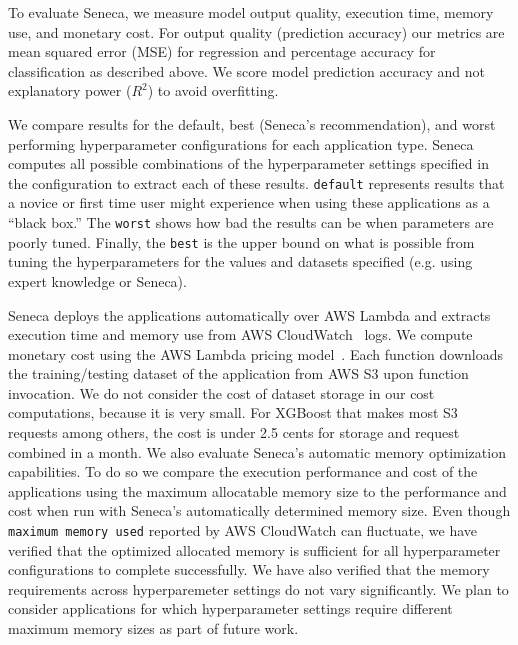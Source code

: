 To evaluate Seneca, we measure model output quality, execution time, memory use, and monetary cost.  For output quality (prediction accuracy) our metrics are mean squared error (MSE) for regression and percentage accuracy for classification as described above. We score model prediction accuracy and not explanatory power ($R^2$) to avoid overfitting. 


We compare results for the default, best (Seneca's recommendation), and worst performing hyperparameter configurations for each application type. Seneca computes all possible combinations of the hyperparameter settings specified in the configuration to extract each of these results.  \texttt{default} represents results that a novice or first time user might experience when using these applications as a ``black box.''  The \texttt{worst} shows how bad the results can be when parameters are poorly tuned.  Finally, the \texttt{best} is the upper bound on what is possible from tuning the hyperparameters for the values and datasets specified  (e.g. using expert knowledge or Seneca). 

Seneca deploys the applications automatically over AWS Lambda
and extracts execution time and memory use from 
AWS CloudWatch~\cite{ref:awscloudwatch} logs.
We compute monetary cost using the AWS Lambda pricing model~\cite{ref:pricing}.
Each function downloads the training/testing dataset 
of the application from AWS S3 upon function invocation. 
We do not consider the cost of dataset storage 
in our cost computations, because it is very small. For XGBoost that makes most S3 requests among others, the cost is under 2.5 cents for storage and request combined in a month.
We also evaluate Seneca's automatic memory optimization capabilities.  To
do so we compare the execution performance and cost of the applications using
the maximum allocatable memory size to the performance and cost when run with
Seneca's automatically determined memory size. Even though \texttt{maximum memory used} reported by AWS CloudWatch can fluctuate, we 
have verified that the optimized allocated memory is sufficient for all 
hyperparameter configurations to complete successfully.  We have also verified
that the memory requirements across hyperparemeter settings do not vary 
significantly. We plan to consider applications for which hyperparameter settings require
different maximum memory sizes as part of future work.


